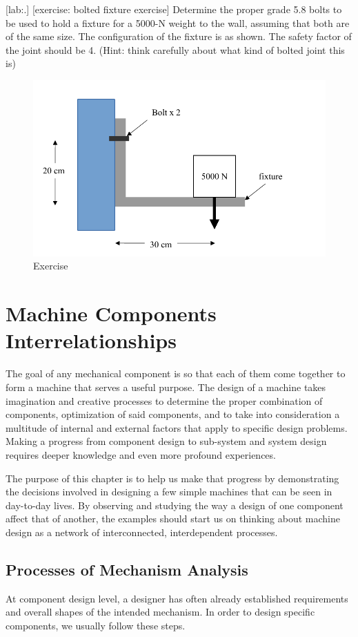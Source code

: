 \documentclass[a4paper,openany,12pt]{book}
\begin{document}
{{[lab:.]
[exercise: bolted fixture exercise] Determine the proper grade 5.8 bolts
to be used to hold a fixture for a 5000-N weight to the wall, assuming
that both are of the same size. The configuration of the fixture is as
shown. The safety factor of the joint should be 4. (Hint: think
carefully about what kind of bolted joint this is)


\begin{figure}[htbp]
\centering
\includegraphics[width=.9\linewidth]{pictures/Bolt/bolted-fixture-exercise.pdf}
\caption{Exercise}
\end{figure}

\chapter{Machine Components Interrelationships}
\label{sec:orgdcece04}
The goal of any mechanical component is so that each of them come
together to form a machine that serves a useful purpose. The design of a
machine takes imagination and creative processes to determine the proper
combination of components, optimization of said components, and to take
into consideration a multitude of internal and external factors that
apply to specific design problems. Making a progress from component
design to sub-system and system design requires deeper knowledge and
even more profound experiences.

The purpose of this chapter is to help us make that progress by
demonstrating the decisions involved in designing a few simple machines
that can be seen in day-to-day lives. By observing and studying the way
a design of one component affect that of another, the examples should
start us on thinking about machine design as a network of
interconnected, interdependent processes.

\section{Processes of Mechanism Analysis}
\label{sec:orgbd3f115}
At component design level, a designer has often already established
requirements and overall shapes of the intended mechanism. In order to
design specific components, we usually follow these steps.

}}
\end{document}
